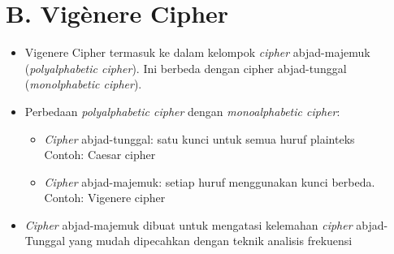 \documentclass{article}
\begin{document}

\section*{B. Vig\`enere Cipher}

\begin{itemize}
    \item Vigenere Cipher termasuk ke dalam kelompok \textit{cipher} abjad-majemuk (\textit{polyalphabetic cipher}). Ini berbeda dengan cipher abjad-tunggal (\textit{monolphabetic cipher}).
    \item Perbedaan \textit{polyalphabetic cipher} dengan \textit{monoalphabetic cipher}:
    \begin{itemize}
        \item[$\blacktriangleright$] \textit{Cipher} abjad-tunggal: satu kunci untuk semua huruf plainteks \\ Contoh: Caesar cipher
        \item[$\blacktriangleright$] \textit{Cipher} abjad-majemuk: setiap huruf menggunakan kunci berbeda. \\ Contoh: Vigenere cipher
    \end{itemize}
    \item \textit{Cipher} abjad-majemuk dibuat untuk mengatasi kelemahan \textit{cipher} abjad-Tunggal yang mudah dipecahkan dengan teknik analisis frekuensi
\end{itemize}
\end{document}
